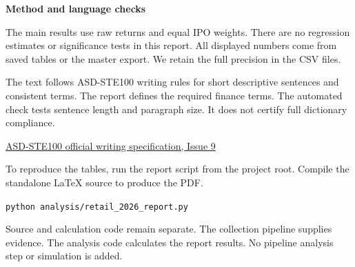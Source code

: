 \documentclass[10pt,a4paper]{article}
\begin{document}
\par\addvspace{4pt}\textbf{Method and language checks}\par\nobreak
The main results use raw returns and equal IPO weights. There are no regression estimates or significance tests in this report. All displayed numbers come from saved tables or the master export. We retain the full precision in the CSV files.


The text follows ASD-STE100 writing rules for short descriptive sentences and consistent terms. The report defines the required finance terms. The automated check tests sentence length and paragraph size. It does not certify full dictionary compliance.


\noindent\href{https://www.asd-ste100.org/assets/files/ASD-STE100_ISSUE9.pdf}{ASD-STE100 official writing specification, Issue 9}\par
To reproduce the tables, run the report script from the project root. Compile the standalone LaTeX source to produce the PDF.


\noindent\texttt{python analysis/retail\_2026\_report.py}\par
Source and calculation code remain separate. The collection pipeline supplies evidence. The analysis code calculates the report results. No pipeline analysis step or simulation is added.
\end{document}
